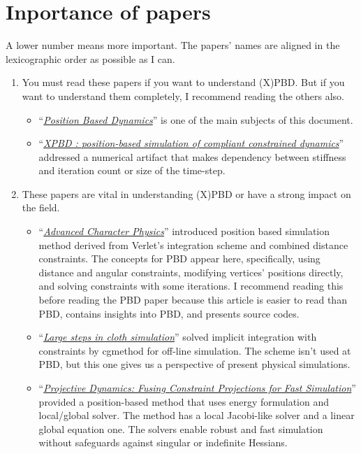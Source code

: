 \documentclass[pdflatex,sn-mathphys-num]{sn-jnl}%
\theoremstyle{thmstyleone}%
\theoremstyle{thmstyletwo}%
\theoremstyle{thmstylethree}%
\newcommand{\pname}[1]{``{\uline{\sl {#1}}}''}
\begin{document}
\section{Inportance of papers}
A lower number means more important. The papers' names are aligned in the lexicographic order as possible as I can.
\begin{enumerate}
	\item You must read these papers if you want to understand (X)PBD. But if you want to understand them completely, I recommend reading the others also.
		\begin{itemize}
			\item \pname{Position Based Dynamics}\cite{PBD} is one of the main subjects of this document.
			\newline
			\item \pname{XPBD : position-based simulation of compliant constrained dynamics}\cite{XPBD} addressed a numerical artifact that makes dependency between stiffness and \gls{iteration} count or size of the time-step.
		\end{itemize}
		\item  These papers are vital in understanding (X)PBD or have a strong impact on the field.
		\begin{itemize}
			\item\pname{Advanced Character Physics}\cite{Jakobsen2003AdvancedCP} introduced position based simulation method derived from Verlet's integration scheme and combined distance constraints. The concepts for PBD appear here, specifically, using distance and angular constraints, modifying vertices' positions directly, and solving \gls{constraint}s with some iterations. I recommend reading this before reading the PBD paper because this article is easier to read than PBD, contains insights into PBD, and presents source codes.
			\newline
			\item \pname{Large steps in cloth simulation}\cite{LargeStepBaraff} solved implicit integration with \gls{constraint}s by \gls{cgmethod} for off-line simulation. The scheme isn't used at PBD, but this one gives us a perspective of present physical simulations.
			\newline
			\item \pname{Projective Dynamics: Fusing Constraint Projections for Fast Simulation}\cite{ProjDyn} provided a position-based method that uses energy formulation and local/global solver. The method has a local Jacobi-like solver and a linear global equation one. The solvers enable robust and fast simulation without safeguards against singular or indefinite Hessians.

\end{itemize}
\end{enumerate}
\end{document}
